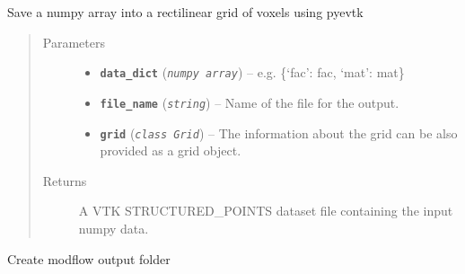 \documentclass[letterpaper,10pt,english]{sphinxmanual}
\begin{document}
\begin{fulllineitems}
\label{hyvr:hyvr.hyvr.utils.to_vtr}
Save a numpy array into a  rectilinear grid of voxels using pyevtk
\begin{quote}\begin{description}
\item[{Parameters}] \leavevmode\begin{itemize}
\item {} 
\textbf{\texttt{data\_dict}} (\emph{\texttt{numpy array}}) -- e.g. \{`fac': fac, `mat': mat\}

\item {} 
\textbf{\texttt{file\_name}} (\emph{\texttt{string}}) -- Name of the file for the output.

\item {} 
\textbf{\texttt{grid}} (\emph{\texttt{class Grid}}) -- The information about the grid can be also provided as a grid object.

\end{itemize}

\item[{Returns}] \leavevmode

A VTK STRUCTURED\_POINTS dataset file containing the input numpy data.


\end{description}\end{quote}

\end{fulllineitems}


\begin{fulllineitems}
\label{hyvr:hyvr.hyvr.utils.try_makefolder}
Create modflow output folder

\end{fulllineitems}

\end{document}
